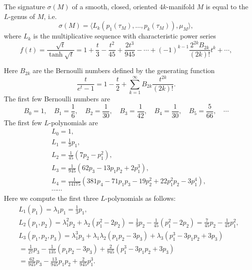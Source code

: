 \begin{theorem}
    The signature $\sigma(M)$ of a smooth, closed, oriented $4k$-manifold $M$ is equal to the $L$-genus of $M$, i.e.
    \begin{equation*}
        \sigma(M) = \langle L_k(p_1(\tau_M), \dots, p_k(\tau_M)), \mu_M \rangle,
    \end{equation*}
    where $L_k$ is the multiplicative sequence with characteristic power series 
    \begin{equation*}
        f(t) = \frac{\sqrt{t}}{\tanh \sqrt{t}} = 1 + \frac{t}{3} - \frac{t^2}{45} + \frac{2 t^3}{945} - \cdots + 
        (-1)^{k-1} \frac{2^{2k} B_{2k}}{(2k)!} t^k + \cdots,
    \end{equation*}
\end{theorem}
Here $B_{2k}$ are the Bernoulli numbers defined by the generating function
\begin{equation*}
    \frac{t}{e^t - 1} = 1 - \frac{t}{2} + \sum_{k=1}^{\infty} B_{2k} \frac{t^{2k}}{(2k)!}.
\end{equation*}
The first few Bernoulli numbers are
\begin{equation*}
    B_0 = 1, \quad B_1 = \frac{1}{6}, \quad B_2 = \frac{1}{30}, \quad B_3 = \frac{1}{42}, \quad B_4 = \frac{1}{30}, \quad B_5 = \frac{5}{66}, \quad \cdots
\end{equation*}
The first few $L$-polynomials are
\begin{align*}
    &L_0 = 1, \\
    &L_1 = \frac{1}{3} p_1, \\
    &L_2 = \frac{1}{45} (7 p_2 - p_1^2), \\
    &L_3 = \frac{1}{945} (62 p_3 - 13 p_1 p_2 + 2 p_1^3), \\
    &L_4 = \frac{1}{14175} (381 p_4 - 71 p_1 p_3 - 19 p_2^2 + 22 p_1^2 p_2 - 3 p_1^4), \\[6pt]
    &\cdots\cdots
\end{align*} 
Here we compute the first three $L$-polynomials as follows:
\begin{align*}
    &L_1(p_1) = \lambda_1 p_1 = \frac{1}{3} p_1, \\
    &L_2(p_1,p_2) = \lambda_1^2 p_2 + \lambda_2 (p_1^2 - 2 p_2) = \frac{1}{9} p_2 - \frac{1}{45} (p_1^2 - 2 p_2) = \frac{7}{45} p_2 - \frac{1}{45} p_1^2, \\
    &L_3(p_1,p_2,p_3) = \lambda_1^3 p_3 + \lambda_1\lambda_2 (p_1 p_2 - 3 p_3) + \lambda_3 (p_1^3 - 3 p_1 p_2 + 3 p_3) \\
    & = \frac{1}{27} p_3 - \frac{1}{135} (p_1 p_2 - 3 p_3) + \frac{2}{945} (p_1^3 - 3 p_1 p_2 + 3 p_3) \\
    & = \frac{62}{945} p_3 - \frac{13}{945} p_1 p_2 + \frac{2}{945} p_1^3.
\end{align*}
